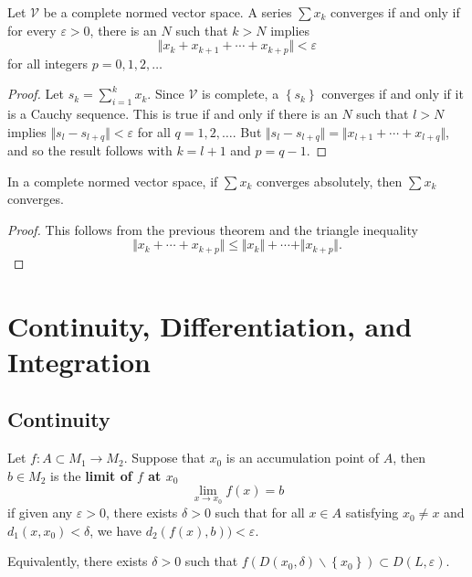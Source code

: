 \documentclass[10pt]{report}
\begin{document}
\begin{thrm}[]
	Let $\mathcal{V}$ be a complete normed vector space. A series $\sum x_k $ converges if and only if for every $\varepsilon>0$, there is an $N$ such that $k  >N$ implies
	\[
	\Vert{x_k + x_{k+1}+\cdots+x_{k+p}}\Vert<\varepsilon
	\] 
	for all integers $p=0,1,2,\dots$
\end{thrm}
\begin{proof}
	Let $s_k = \sum_{i=1}^{k} x_k$. Since $\mathcal{V}$ is complete, a $\left\{ s_k \right\}$ converges if and only if it is a Cauchy sequence. This is true if and only if there is an $N$ such that $l > N$ implies $\Vert{s_l - s_{l+q}}\Vert <\varepsilon$ for all $q=1,2,\dots$. But $\Vert{s_l - s_{l+q}}\Vert=\Vert{x_{l+1}+\cdots+x_{l+q}}\Vert$, and so the result follows with $k=l+1$ and $p=q-1$.
\end{proof}

\begin{thrm}{}{}
In a complete normed vector space, if $\sum x_k$ converges absolutely, then $\sum x_k$ converges.
\end{thrm}
\begin{proof}
	This follows from the previous theorem and the triangle inequality
	 \[
	\Vert{x_k + \cdots + x_{k+p}}\Vert \leq \Vert{x_k}\Vert+\cdots+\Vert{x_{k+p}}\Vert.
	\] 
\end{proof}


\chapter{Continuity, Differentiation, and Integration}


\section{Continuity}

\begin{defn}[]
Let $f: A \subset M_1 \to M_2$. Suppose that $x_0$ is an accumulation point of $A$, then $b \in M_2$ is the \textbf{limit of $f$ at $x_0$} 
\[
	\lim_{x \to x_0} f(x) = b
\] 
if given any $\varepsilon>0$, there exists $\delta>0$ such that for all $x\in A$ satisfying $x_0 \neq x$ and $d_1(x,x_0)<\delta$, we have $d_2(f(x),b))<\varepsilon$.

Equivalently, there exists $\delta>0$ such that $f(D(x_0,\delta) \backslash \left\{ x_0 \right\}) \subset D(L,\varepsilon)$.
\end{defn}
\end{document}
